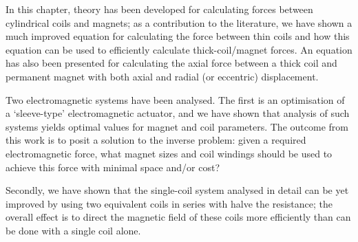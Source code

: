 \documentclass[11pt,a4paper]{memoir}
\begin{document}
In this chapter, theory has been developed for calculating forces between cylindrical coils and magnets; as a contribution to the literature, we have shown a much improved equation for calculating the force between thin coils and how this equation can be used to efficiently calculate thick-coil/magnet forces.
An equation has also been presented for calculating the axial force between a thick coil and permanent magnet with both axial and radial (or eccentric) displacement.

Two electromagnetic systems have been analysed.
The first is an optimisation of a `sleeve-type' electromagnetic actuator, and we have shown that analysis of such systems yields optimal values for magnet and coil parameters.
The outcome from this work is to posit a solution to the inverse problem: given a required electromagnetic force, what magnet sizes and coil windings should be used to achieve this force with minimal space and/or cost?

Secondly, we have shown that the single-coil system analysed in detail can be yet improved by using two equivalent coils in series with halve the resistance; the overall effect is to direct the magnetic field of these coils more efficiently than can be done with a single coil alone.
\end{document}
